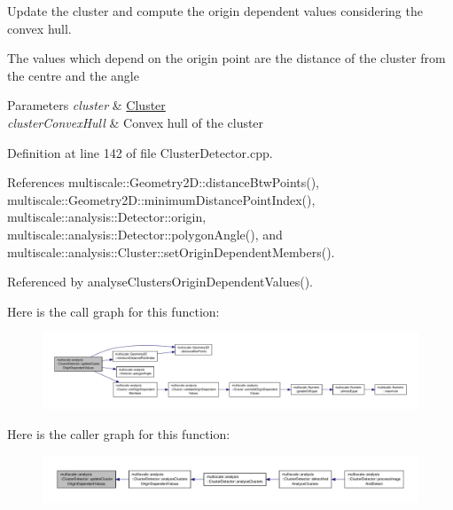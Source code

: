 Update the cluster and compute the origin dependent values considering the convex hull. 

The values which depend on the origin point are the distance of the cluster from the centre and the angle


\begin{DoxyParams}{Parameters}
{\em cluster} & \hyperlink{classmultiscale_1_1analysis_1_1Cluster}{Cluster} \\
\hline
{\em cluster\-Convex\-Hull} & Convex hull of the cluster \\
\hline
\end{DoxyParams}


Definition at line 142 of file Cluster\-Detector.\-cpp.



References multiscale\-::\-Geometry2\-D\-::distance\-Btw\-Points(), multiscale\-::\-Geometry2\-D\-::minimum\-Distance\-Point\-Index(), multiscale\-::analysis\-::\-Detector\-::origin, multiscale\-::analysis\-::\-Detector\-::polygon\-Angle(), and multiscale\-::analysis\-::\-Cluster\-::set\-Origin\-Dependent\-Members().



Referenced by analyse\-Clusters\-Origin\-Dependent\-Values().



Here is the call graph for this function\-:
\nopagebreak
\begin{figure}[H]
\begin{center}
\leavevmode
\includegraphics[width=350pt]{classmultiscale_1_1analysis_1_1ClusterDetector_ac7e008a7674205095f94b91c8d7cdccc_cgraph}
\end{center}
\end{figure}




Here is the caller graph for this function\-:
\nopagebreak
\begin{figure}[H]
\begin{center}
\leavevmode
\includegraphics[width=350pt]{classmultiscale_1_1analysis_1_1ClusterDetector_ac7e008a7674205095f94b91c8d7cdccc_icgraph}
\end{center}
\end{figure}




